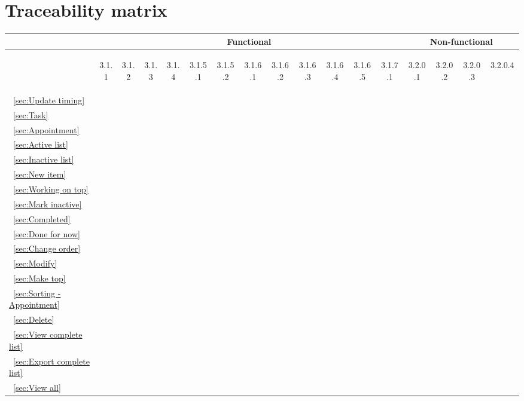 \documentclass[12pt]{article}
\renewcommand{\c}{\checkmark}
\newcommand{\s}[1] {\begin{sideways}#1\end{sideways}}
\begin{document}
\section{Traceability matrix}
\begin{center}
\begin{tabular}{|l||*{12}{c|}|*{4}{c|}}
\hline
\multicolumn{1}{|c||}{ }&
\multicolumn{12}{|c||}{Functional} &
\multicolumn{4}{|c|}{Non-functional}\\
\hline
	& \s{3.1.1} & \s{3.1.2} & \s{3.1.3} & \s{3.1.4} & \s{3.1.5.1} & \s{3.1.5.2} & \s{3.1.6.1} & \s{3.1.6.2} & \s{3.1.6.3} & \s{3.1.6.4} & \s{3.1.6.5} & \s{3.1.7.1} & \s{3.2.0.1} & \s{3.2.0.2} & \s{3.2.0.3} & \s{3.2.0.4~~}\\
\hline
\hline
~\ref{sec:Update timing}	&	&	&	&	&	&	&	&	&	&	&	&	&\c	&	&	&	\\
\hline
~\ref{sec:Task}				&\c	&	&	&	&	&	&	&	&	&	&	&	&	&	&	&	\\
\hline
~\ref{sec:Appointment}		&	&\c	&	&	&	&	&	&	&	&	&	&	&	&	&	&	\\
\hline
~\ref{sec:Active list}		&	&	&\c	&	&	&	&	&	&	&	&	&	&	&	&	&	\\
\hline
~\ref{sec:Inactive list}	&	&	&	&\c	&	&	&	&	&	&	&	&	&	&\c	&	&	\\
\hline
~\ref{sec:New item}			&	&	&	&	&	&	&	&	&	&	&	&	&	&	&	&	\\
\hline
~\ref{sec:Working on top}	&	&	&	&	&	&	&\c	&	&	&	&	&	&	&	&	&	\\
\hline
~\ref{sec:Mark inactive}	&	&	&	&	&	&	&	&\c	&	&	&	&	&	&	&	&	\\
\hline
~\ref{sec:Completed}		&	&	&	&	&	&	&	&	&\c	&	&	&	&	&	&	&	\\
\hline
~\ref{sec:Done for now}		&	&	&	&	&	&	&	&	&	&\c	&	&	&	&	&	&	\\
\hline
~\ref{sec:Change order}		&	&	&	&	&	&\c	&	&	&	&	&\c	&	&	&	&	&	\\
\hline
~\ref{sec:Modify}			&	&	&	&	&\c	&	&	&	&	&	&	&	&	&	&	&	\\
\hline
~\ref{sec:Make top}			&	&	&	&	&	&\c	&	&	&	&	&	&	&	&	&	&	\\
\hline
~\ref{sec:Sorting - Appointment}
							&	&	&	&	&	&	&	&	&	&	&	&\c	&\c	&	&	&	\\
\hline
~\ref{sec:Delete}			&	&	&	&	&	&	&	&	&	&	&	&	&	&	&	&\c	\\
\hline
~\ref{sec:View complete list}
							&	&	&	&	&	&	&	&	&	&	&	&	&	&	&\c	&	\\
\hline
~\ref{sec:Export complete list}
							&	&	&	&	&	&	&	&	&	&	&	&	&	&	&\c	&	\\
\hline
~\ref{sec:View all}			&	&	&	&	&	&	&	&	&	&	&	&	&	&	&\c	&	\\
\hline
\end{tabular}
\end{center}
\end{document}
